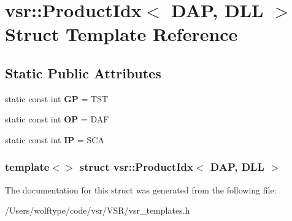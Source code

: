 \hypertarget{structvsr_1_1_product_idx_3_01_d_a_p_00_01_d_l_l_01_4}{\section{vsr\-:\-:Product\-Idx$<$ D\-A\-P, D\-L\-L $>$ Struct Template Reference}
\label{structvsr_1_1_product_idx_3_01_d_a_p_00_01_d_l_l_01_4}
}
\subsection*{Static Public Attributes}
\begin{DoxyCompactItemize}
\item 
\hypertarget{structvsr_1_1_product_idx_3_01_d_a_p_00_01_d_l_l_01_4_a4c8302d6c0e27c044648b54a43f15626}{static const int {\bfseries G\-P} = T\-S\-T}\label{structvsr_1_1_product_idx_3_01_d_a_p_00_01_d_l_l_01_4_a4c8302d6c0e27c044648b54a43f15626}

\item 
\hypertarget{structvsr_1_1_product_idx_3_01_d_a_p_00_01_d_l_l_01_4_a53450d59bd22c74cbaa52c8da1d7a1e2}{static const int {\bfseries O\-P} = D\-A\-F}\label{structvsr_1_1_product_idx_3_01_d_a_p_00_01_d_l_l_01_4_a53450d59bd22c74cbaa52c8da1d7a1e2}

\item 
\hypertarget{structvsr_1_1_product_idx_3_01_d_a_p_00_01_d_l_l_01_4_acee5e1bb77ae11867bfe5a0f064bf44f}{static const int {\bfseries I\-P} = S\-C\-A}\label{structvsr_1_1_product_idx_3_01_d_a_p_00_01_d_l_l_01_4_acee5e1bb77ae11867bfe5a0f064bf44f}

\end{DoxyCompactItemize}
\subsubsection*{template$<$$>$ struct vsr\-::\-Product\-Idx$<$ D\-A\-P, D\-L\-L $>$}



The documentation for this struct was generated from the following file\-:\begin{DoxyCompactItemize}
\item 
/\-Users/wolftype/code/vsr/\-V\-S\-R/vsr\-\_\-templates.\-h\end{DoxyCompactItemize}
